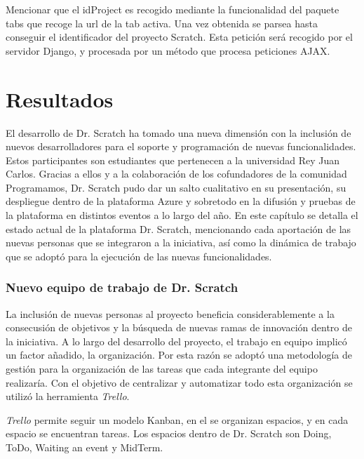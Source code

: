 \documentclass[a4paper, 12pt]{book}
\begin{document}
Mencionar que el idProject es recogido mediante la funcionalidad del paquete tabs
que recoge la url de la tab activa. Una vez obtenida se parsea hasta conseguir
el identificador del proyecto Scratch. Esta petición será recogido por el servidor 
Django, y procesada por un método que procesa peticiones AJAX. 


\cleardoublepage
\chapter{Resultados}

El desarrollo de Dr. Scratch ha tomado una nueva dimensión con la inclusión de nuevos 
desarrolladores para el soporte y programación de nuevas funcionalidades. Estos 
participantes son estudiantes que pertenecen a la universidad Rey Juan Carlos. Gracias
a ellos y a la colaboración de los cofundadores de la comunidad Programamos,
Dr. Scratch pudo dar un salto cualitativo en su presentación, su despliegue dentro 
de la plataforma Azure y sobretodo en la difusión y pruebas de la plataforma en 
distintos eventos a lo largo del año. En este capítulo se detalla el estado actual de 
la plataforma Dr. Scratch, mencionando cada aportación de las nuevas personas que se 
integraron a la iniciativa, así como la dinámica de trabajo que se adoptó para la 
ejecución de las nuevas funcionalidades.

\subsection{Nuevo equipo de trabajo de Dr. Scratch}

La inclusión de nuevas personas al proyecto beneficia considerablemente a la 
consecusión de objetivos y la búsqueda de nuevas ramas de innovación dentro de la
iniciativa. A lo largo del desarrollo del proyecto, el trabajo en equipo implicó
un factor añadido, la organización. Por esta razón se adoptó una metodología de 
gestión para la organización de las tareas que cada integrante del equipo realizaría. 
Con el objetivo de centralizar y automatizar todo esta organización se utilizó
la herramienta \emph{Trello}.  

\emph{Trello} permite seguir un modelo Kanban, en el se organizan espacios, y en
cada espacio se encuentran tareas. Los espacios dentro de Dr. Scratch son Doing, ToDo,
Waiting an event y MidTerm.
\end{document}
